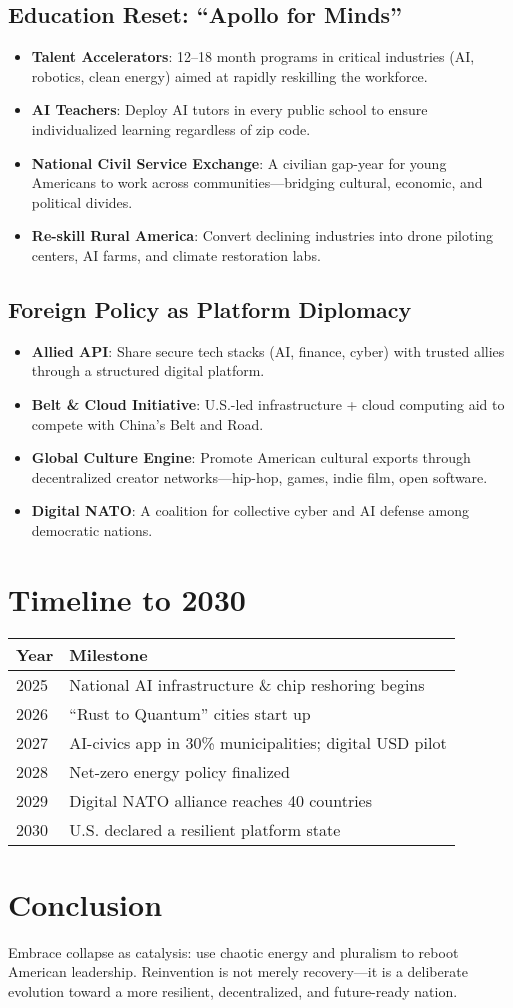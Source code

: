 \documentclass[11pt]{article}
\begin{document}
\subsection{Education Reset: “Apollo for Minds”}
\begin{itemize}
    \item \textbf{Talent Accelerators}: 12–18 month programs in critical industries (AI, robotics, clean energy) aimed at rapidly reskilling the workforce.
    \item \textbf{AI Teachers}: Deploy AI tutors in every public school to ensure individualized learning regardless of zip code.
    \item \textbf{National Civil Service Exchange}: A civilian gap-year for young Americans to work across communities—bridging cultural, economic, and political divides.
    \item \textbf{Re-skill Rural America}: Convert declining industries into drone piloting centers, AI farms, and climate restoration labs.
\end{itemize}

\subsection{Foreign Policy as Platform Diplomacy}
\begin{itemize}
    \item \textbf{Allied API}: Share secure tech stacks (AI, finance, cyber) with trusted allies through a structured digital platform.
    \item \textbf{Belt \& Cloud Initiative}: U.S.-led infrastructure + cloud computing aid to compete with China’s Belt and Road.
    \item \textbf{Global Culture Engine}: Promote American cultural exports through decentralized creator networks—hip-hop, games, indie film, open software.
    \item \textbf{Digital NATO}: A coalition for collective cyber and AI defense among democratic nations.
\end{itemize}

\section{Timeline to 2030}
\begin{tabular}{ll}
\hline
Year & Milestone \\
\hline
2025 & National AI infrastructure \& chip reshoring begins \\
2026 & “Rust to Quantum” cities start up \\
2027 & AI-civics app in 30\% municipalities; digital USD pilot \\
2028 & Net-zero energy policy finalized \\
2029 & Digital NATO alliance reaches 40 countries \\
2030 & U.S. declared a resilient platform state \\
\hline
\end{tabular}

\section{Conclusion}
Embrace collapse as catalysis: use chaotic energy and pluralism to reboot American leadership. Reinvention is not merely recovery—it is a deliberate evolution toward a more resilient, decentralized, and future-ready nation.



\end{document}
